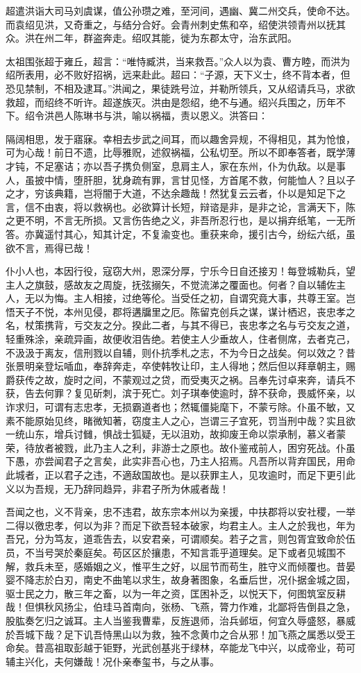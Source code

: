 \documentclass[12pt,UTF8]{ctexbook}
\begin{document}
超遣洪诣大司马刘虞谋，值公孙瓒之难，至河间，遇幽、冀二州交兵，使命不达。而袁绍见洪，又奇重之，与结分合好。会青州刺史焦和卒，绍使洪领青州以抚其众。洪在州二年，群盗奔走。绍叹其能，徙为东郡太守，治东武阳。

太祖围张超于雍丘，超言：“唯恃臧洪，当来救吾。”众人以为袁、曹方睦，而洪为绍所表用，必不败好招祸，远来赴此。超曰：“子源，天下义士，终不背本者，但恐见禁制，不相及逮耳。”洪闻之，果徒跣号泣，并勒所领兵，又从绍请兵马，求欲救超，而绍终不听许。超遂族灭。洪由是怨绍，绝不与通。绍兴兵围之，历年不下。绍令洪邑人陈琳书与洪，喻以祸福，责以恩义。洪答曰：

隔阔相思，发于寤寐。幸相去步武之间耳，而以趣舍异规，不得相见，其为怆悢，可为心哉！前日不遗，比辱雅贶，述叙祸福，公私切至。所以不即奉答者，既学薄才钝，不足塞诘；亦以吾子携负侧室，息肩主人，家在东州，仆为仇敌。以是事人，虽披中情，堕肝胆，犹身疏有罪，言甘见怪，方首尾不救，何能恤人？且以子之才，穷该典籍，岂将闇于大道，不达余趣哉！然犹复云云者，仆以是知足下之言，信不由衷，将以救祸也。必欲算计长短，辩谘是非，是非之论，言满天下，陈之更不明，不言无所损。又言伤告绝之义，非吾所忍行也，是以捐弃纸笔，一无所答。亦冀遥忖其心，知其计定，不复渝变也。重获来命，援引古今，纷纭六纸，虽欲不言，焉得已哉！

仆小人也，本因行役，寇窃大州，恩深分厚，宁乐今日自还接刃！每登城勒兵，望主人之旗鼓，感故友之周旋，抚弦搦矢，不觉流涕之覆面也。何者？自以辅佐主人，无以为悔。主人相接，过绝等伦。当受任之初，自谓究竟大事，共尊王室。岂悟天子不悦，本州见侵，郡将遘牖里之厄。陈留克创兵之谋，谋计栖迟，丧忠孝之名，杖策携背，亏交友之分。揆此二者，与其不得已，丧忠孝之名与亏交友之道，轻重殊涂，亲疏异画，故便收泪告绝。若使主人少垂故人，住者侧席，去者克己，不汲汲于离友，信刑戮以自辅，则仆抗季札之志，不为今日之战矣。何以效之？昔张景明亲登坛喢血，奉辞奔走，卒使韩牧让印，主人得地；然后但以拜章朝主，赐爵获传之故，旋时之间，不蒙观过之贷，而受夷灭之祸。吕奉先讨卓来奔，请兵不获，告去何罪？复见斫刺，滨于死亡。刘子琪奉使逾时，辞不获命，畏威怀亲，以诈求归，可谓有志忠孝，无损霸道者也；然辄僵毙麾下，不蒙亏除。仆虽不敏，又素不能原始见终，睹微知著，窃度主人之心，岂谓三子宜死，罚当刑中哉？实且欲一统山东，增兵讨雠，惧战士狐疑，无以沮劝，故抑废王命以崇承制，慕义者蒙荣，待放者被戮，此乃主人之利，非游士之原也。故仆鉴戒前人，困穷死战。仆虽下愚，亦尝闻君子之言矣，此实非吾心也，乃主人招焉。凡吾所以背弃国民，用命此城者，正以君子之违，不適敌国故也。是以获罪主人，见攻逾时，而足下更引此义以为吾规，无乃辞同趋异，非君子所为休戚者哉！

吾闻之也，义不背亲，忠不违君，故东宗本州以为亲援，中扶郡将以安社稷，一举二得以徼忠孝，何以为非？而足下欲吾轻本破家，均君主人。主人之於我也，年为吾兄，分为笃友，道乖告去，以安君亲，可谓顺矣。若子之言，则包胥宜致命於伍员，不当号哭於秦庭矣。苟区区於攘患，不知言乖乎道理矣。足下或者见城围不解，救兵未至，感婚姻之义，惟平生之好，以屈节而苟生，胜守义而倾覆也。昔晏婴不降志於白刃，南史不曲笔以求生，故身著图象，名垂后世，况仆据金城之固，驱士民之力，散三年之畜，以为一年之资，匡困补乏，以悦天下，何图筑室反耕哉！但惧秋风扬尘，伯珪马首南向，张杨、飞燕，膂力作难，北鄙将告倒县之急，股肱奏乞归之诚耳。主人当鉴我曹辈，反旌退师，治兵邺垣，何宜久辱盛怒，暴威於吾城下哉？足下讥吾恃黑山以为救，独不念黄巾之合从邪！加飞燕之属悉以受王命矣。昔高祖取彭越于钜野，光武创基兆于绿林，卒能龙飞中兴，以成帝业，苟可辅主兴化，夫何嫌哉！况仆亲奉玺书，与之从事。
\end{document}
